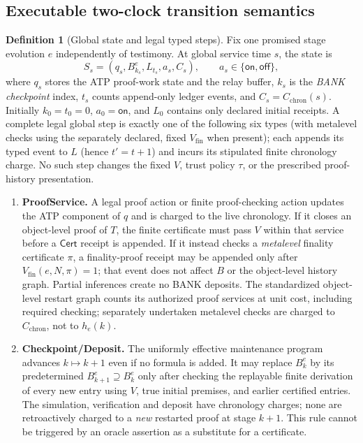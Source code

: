 \documentclass[11pt,letterpaper]{article}
\theoremstyle{definition}
\newtheorem{definition}[theorem]{Definition}
\theoremstyle{remark}
\newcommand{\Cert}{\mathsf{Cert}}
\begin{document}
\subsection*{Executable two-clock transition semantics}
\begin{definition}[Global state and legal typed steps]
Fix one promised stage evolution $e$ independently of testimony. At global service time $s$, the state is
\[
S_s=(q_s,B^e_{k_s},L_{t_s},a_s,C_s),\qquad a_s\in\{\mathsf{on},\mathsf{off}\},
\]
where $q_s$ stores the ATP proof-work state and the relay buffer, $k_s$ is the \emph{BANK checkpoint} index, $t_s$ counts append-only ledger events, and $C_s=C_{\mathrm{chron}}(s)$. Initially $k_0=t_0=0$, $a_0=\mathsf{on}$, and $L_0$ contains only declared initial receipts. A complete legal global step is exactly one of the following six types (with metalevel checks using the separately declared, fixed $V_{\mathrm{fin}}$ when present); each appends its typed event to $L$ (hence $t'=t+1$) and incurs its stipulated finite chronology charge. No such step changes the fixed $V$, trust policy $\tau$, or the prescribed proof-history presentation.
\begin{enumerate}[label=(\textsf{\Alph*}),leftmargin=11mm]
\item \textbf{ProofService.} A legal proof action or finite proof-checking action updates the ATP component of $q$ and is charged to the live chronology. If it closes an object-level proof of $T$, the finite certificate must pass $V$ within that service before a $\Cert$ receipt is appended. If it instead checks a \emph{metalevel} finality certificate $\pi$, a finality-proof receipt may be appended only after $V_{\mathrm{fin}}(e,N,\pi)=1$; that event does not affect $B$ or the object-level history graph. Partial inferences create no BANK deposits. The standardized object-level restart graph counts its authorized proof services at unit cost, including required checking; separately undertaken metalevel checks are charged to $C_{\mathrm{chron}}$, not to $h_e(k)$.
\item \textbf{Checkpoint/Deposit.} The uniformly effective maintenance program advances $k\mapsto k+1$ even if no formula is added. It may replace $B^e_k$ by its predetermined $B^e_{k+1}\supseteq B^e_k$ only after checking the replayable finite derivation of every new entry using $V$, true initial premises, and earlier certified entries. The simulation, verification and deposit have chronology charges; none are retroactively charged to a \emph{new} restarted proof at stage $k+1$. This rule cannot be triggered by an oracle assertion as a substitute for a certificate.

\end{enumerate}
\end{definition}
\end{document}
